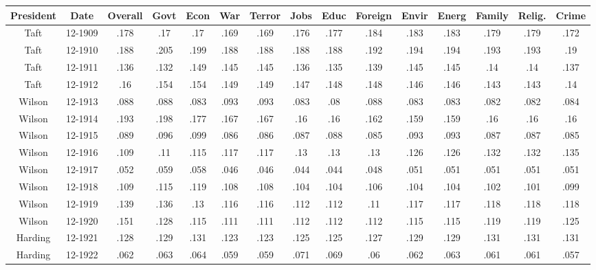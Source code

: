 \begin{sidewaystable}
\begin{singlespace}
\begin{center}
 \begin{tabular}{||c c c c c c c c c c c c c c c||}
 \hline
 President & Date & Overall & Govt & Econ & War & Terror & Jobs & Educ & Foreign & Envir & Energ & Family & Relig. & Crime \\
 \hline\hline
Taft & 12-1909 & .178 & .17 & .17 & .169 & .169 & .176 & .177 & .184 & .183 & .183 & .179 & .179 & .172 \\ 
\hline
Taft & 12-1910 & .188 & .205 & .199 & .188 & .188 & .188 & .188 & .192 & .194 & .194 & .193 & .193 & .19 \\ 
\hline
Taft & 12-1911 & .136 & .132 & .149 & .145 & .145 & .136 & .135 & .139 & .145 & .145 & .14 & .14 & .137 \\ 
\hline
Taft & 12-1912 & .16 & .154 & .154 & .149 & .149 & .147 & .148 & .148 & .146 & .146 & .143 & .143 & .14 \\ 
\hline
Wilson & 12-1913 & .088 & .088 & .083 & .093 & .093 & .083 & .08 & .088 & .083 & .083 & .082 & .082 & .084 \\ 
\hline
Wilson & 12-1914 & .193 & .198 & .177 & .167 & .167 & .16 & .16 & .162 & .159 & .159 & .16 & .16 & .16 \\ 
\hline
Wilson & 12-1915 & .089 & .096 & .099 & .086 & .086 & .087 & .088 & .085 & .093 & .093 & .087 & .087 & .085 \\ 
\hline
Wilson & 12-1916 & .109 & .11 & .115 & .117 & .117 & .13 & .13 & .13 & .126 & .126 & .132 & .132 & .135 \\ 
\hline
Wilson & 12-1917 & .052 & .059 & .058 & .046 & .046 & .044 & .044 & .048 & .051 & .051 & .051 & .051 & .051 \\ 
\hline
Wilson & 12-1918 & .109 & .115 & .119 & .108 & .108 & .104 & .104 & .106 & .104 & .104 & .102 & .101 & .099 \\ 
\hline
Wilson & 12-1919 & .139 & .136 & .13 & .116 & .116 & .112 & .112 & .11 & .117 & .117 & .118 & .118 & .118 \\ 
\hline
Wilson & 12-1920 & .151 & .128 & .115 & .111 & .111 & .112 & .112 & .112 & .115 & .115 & .119 & .119 & .125 \\ 
\hline
Harding & 12-1921 & .128 & .129 & .131 & .123 & .123 & .125 & .125 & .127 & .129 & .129 & .131 & .131 & .131 \\ 
\hline
Harding & 12-1922 & .062 & .063 & .064 & .059 & .059 & .071 & .069 & .06 & .062 & .063 & .061 & .061 & .057 \\ 

\end{tabular}
\end{center}
\end{singlespace}
\end{sidewaystable}
